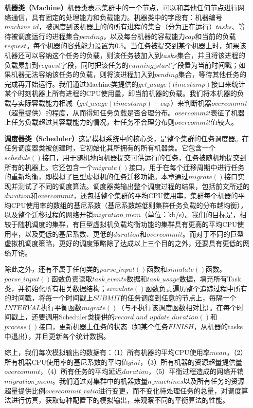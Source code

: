 \noindent\textbf{机器类（Machine）}\quad \label{chap:machine}机器类表示集群中的一个节点，可以和其他任何节点进行网络通信，具有固定的处理能力和负载能力。机器类中的字段有：机器编号$machine\_id$，被调度到该机器上的的所有进程的集合（分为正在运行）$tasks$、等待被调度运行的进程集合$pending$，以及每台机器的容载能力$cap$和当前的负载$request$。每个机器的容载能力设置为$0.5$。当任务被提交到某个机器上时，如果该机器还可以容纳这个任务的负载，则该任务被加入到$tasks$集合，并且将该进程的负载累加到$request$字段，同时把该任务的$running\_start$字段置为当前时间戳；如果机器无法容纳该任务的负载，则将该进程加入到$pending$集合，等待其他任务的完成再开始运行。我们通过Machine类提供的$get\_usage(timestamp)$接口来统计某个时刻机器上所有进程的CPU使用量，即当前机器的负载。我们将本机器的负载与实际容载能力相减（$get\_usage(timestamp) - cap$）来判断机器$overcommit$（超量提供）的程度，从而得知任务负载是否合理分布。$overcommit$表征了机器上任务负载超过其容载能力的情况，若任务不合理分布则$overcommit$值较大。

\noindent\textbf{调度器类（Scheduler）}\quad \label{chap:scheduler}这是模拟系统中的核心类，是整个集群的任务调度器。在任务调度器类被创建时，它初始化其所拥有的所有机器类。它包含一个$schedule()$接口，用于随机地向机器提交可供运行的任务，任务被随机地提交到所有的机器上。它还包含一个$migrate()$接口，用于在每个迁移周期中进行任务的重新均衡，即模拟了巨型虚拟机的任务迁移功能。本章通过$migrate()$接口实现并测试了不同的调度算法。调度器类输出整个调度过程的结果，包括前文所述的$duration$和$overcommit$，还包括整个集群的平均CPU使用率，集群每个机器的平均CPU使用率的数组的基尼系数（基尼系数越低则集群任务负载的分布越均衡），以及整个迁移过程的网络开销$migration\_mem$（单位：kb/s）。我们的目标是，相较于随机调度的集群，有巨型虚拟机负载均衡功能的集群具有更高的平均CPU使用率，以及更低的基尼系数、更低的$duration$和$overcommit$。而对于不同的巨型虚拟机调度策略，更好的调度策略除了达成以上三个目的之外，还要具有更低的网络开销。

除此之外，还有不属于任何类的$parse\_input()$函数和$simulate()$函数。$parse\_input()$函数负责读取$task\_events$数据和$task\_usage$数据，填充所有Task类，并初始化所有相关数据结构；$simulate()$函数负责遍历整个追踪过程中所有的时间戳，将每一个时间戳上$SUBMIT$的任务调度到任意的节点上，每隔一个$INTERVAL$执行平衡函数$migrate()$（与不执行该调度函数相对比）。在每个时间戳上，还要调用Scheduler类提供的$record\_and\_update\_duration()$和$process()$接口，更新机器上任务的状态（如某个任务$FINISH$，从机器的tasks中退出），并且更新各个统计数据。

综上，我们每次模拟输出的数据有：（1）所有机器的平均CPU使用率$mean$，（2）所有机器CPU使用率的基尼系数的平均值$gini$，（3）所有机器的资源超量提供量$overcommit$，（4）所有任务的平均延迟$duration$，（5）平衡过程造成的网络开销$migration\_mem$。我们通过对集群中的机器数量$n\_machines$以及所有任务的资源超量提供比例$overcommit\_ratio$进行变更，而不变化待处理任务的总量，对调度算法进行仿真，获取每种配置下的模拟输出，来观察不同的平衡算法的性能。

